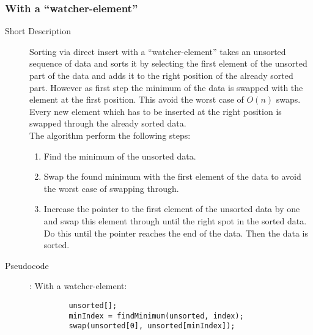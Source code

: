 \documentclass[11pt]{amsart}
\begin{document}
\subsubsection{With a \enquote{watcher-element}}
\begin{description}
	\item[Short Description] Sorting via direct insert with a \enquote{watcher-element} takes an unsorted sequence of data and sorts it by selecting the first element of the unsorted part of the data and adds it to the right position of the already sorted part. However as first step the minimum of the data is swapped with the element at the first position. This avoid the worst case of $O(n)$ swaps. Every new element which has to be inserted at the right position is swapped through the already sorted data. \\ The algorithm perform the following steps:
	\begin{enumerate}
		\item Find the minimum of the unsorted data.
		\item Swap the found minimum with the first element of the data to avoid the worst case of swapping through.
		\item Increase the pointer to the first element of the unsorted data by one and swap this element through until the right spot in the sorted data. Do this until the pointer reaches the end of the data. Then the data is sorted.
	\end{enumerate}
	\item[Pseudocode]: With a watcher-element:
		\begin{lstlisting}
		 unsorted[];
		 minIndex = findMinimum(unsorted, index);
		 swap(unsorted[0], unsorted[minIndex]);
		 		 

\end{lstlisting}
\end{description}
\end{document}
